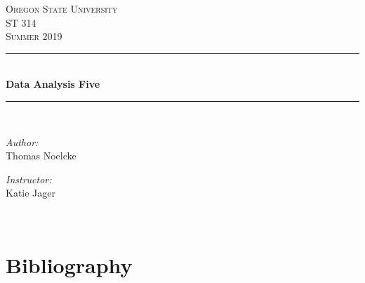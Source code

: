 \documentclass[letterpaper, onecolumn,10pt]{IEEEtran}
\begin{document}
    \begin{titlepage}
    \newcommand{\HRule}{\rule{\linewidth}{0.5mm}}
    \center
    \textsc{\Large Oregon State University}\\[1.5cm]
    \textsc{\Large ST 314}\\[0.5cm]
    \textsc{\Large Summer 2019}\\[0.5cm]
    \HRule \\[0.4cm]
    { \huge \bfseries Data Analysis Five}\\[0.4cm] %
    \HRule \\[1.5cm]
    \begin{minipage}{0.4\textwidth}
        \begin{flushleft} \large
        \emph{Author:}\\
        Thomas Noelcke
        \end{flushleft}
    \end{minipage}
    \begin{minipage}{0.4\textwidth}
        \begin{flushright} \large
        \emph{Instructor:} \\
        Katie Jager\\
        \end{flushright}
    \end{minipage}\\[2cm]
		\end{titlepage}
        
        \section{}
		
		
		\section{Bibliography}
		
		
\end{document}
